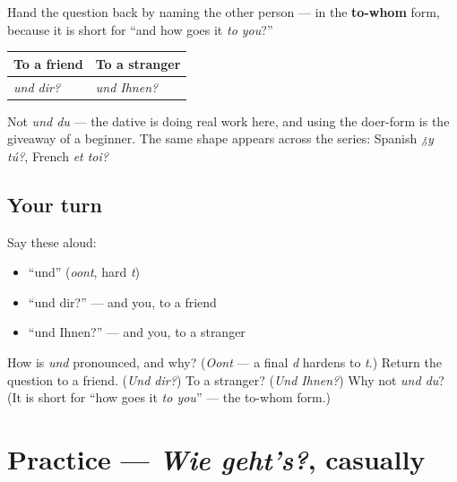 \begin{grammarlens}[title={Grammar Lens: returning the question}]
Hand the question back by naming the other person — in the \textbf{to-whom} form, because it is short for \textquotedblleft{}and how goes it \emph{to you}?\textquotedblright{}

\noindent
\begin{tabularx}{\linewidth}{@{}>{\raggedright\arraybackslash}X>{\raggedright\arraybackslash}X@{}}
\toprule
\textbf{To a friend} & \textbf{To a stranger} \\
\midrule
\emph{und dir?} & \emph{und Ihnen?} \\
\bottomrule
\end{tabularx}

Not \emph{und du} — the dative is doing real work here, and using the doer-form is the giveaway of a beginner. The same shape appears across the series: Spanish \emph{¿y tú?}, French \emph{et toi?}
\end{grammarlens}

\subsection*{Your turn}
Say these aloud:

\begin{itemize}
\raggedright
  \item \textquotedblleft{}und\textquotedblright{} (\emph{oont}, hard \emph{t})
  \item \textquotedblleft{}und dir?\textquotedblright{} — and you, to a friend
  \item \textquotedblleft{}und Ihnen?\textquotedblright{} — and you, to a stranger
\end{itemize}

\begin{tcolorbox}[breakable,colback=teal!4,colframe=teal!35!black,title={Before you move on}]
How is \emph{und} pronounced, and why? (\emph{Oont} — a final \emph{d} hardens to \emph{t}.) Return the question to a friend. (\emph{Und dir?}) To a stranger? (\emph{Und Ihnen?}) Why not \emph{und du}? (It is short for \textquotedblleft{}how goes it \emph{to you}\textquotedblright{} — the to-whom form.)
\end{tcolorbox}
\section[Practice]{Practice — \emph{Wie geht's?}, casually}

\label{lesson:GE-C03-practice}




